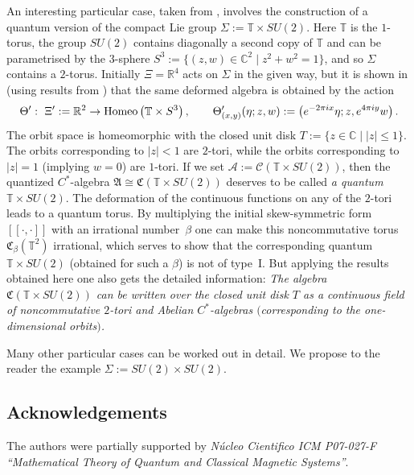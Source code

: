 \documentclass[pdftex]{sigma}
\def\A{{\mathcal A}}
\def\Th{\Theta}
\def\AA{\mathfrak A}
\def\C{\mathcal{C}}
\def\CC{{\mathfrak C}}
\def\Si{\Sigma}
\providecommand{\CC}{\mathfrak{C}}
\begin{document}
\begin{Example}\label{quartu}
An interesting particular case, taken from \cite{Rie3}, involves the construction of a quantum version of the compact Lie group
$\Si:=\mathbb T\times SU(2)$. Here $\mathbb T$ is the $1$-torus, the group $SU(2)$ contains diagonally a second
copy of $\mathbb T$ and can be parametrised
by the $3$-sphere $S^3:=\{(z,w)\in \mathbb C^2\mid z^2+w^2=1\}$, and so $\Si$ contains a $2$-torus.
Initially $\Xi=\mathbb R^4$ acts on $\Si$ in the
given way, but it is shown in \cite{Rie3} (using results from \cite{Rie1}) that the same deformed algebra is obtained
by the action
\[
\Th': \ \Xi':=\mathbb R^2\rightarrow{\rm Homeo}\left(\mathbb T\times S^3\right),\qquad
\Th'_{(x,y)}(\eta;z,w):=\left(e^{-2\pi ix}\eta;z,e^{4\pi iy}w\right).
\]
The orbit space is homeomorphic with the closed unit disk $T:=\{z\in\mathbb C\mid |z|\le 1\}$.
The orbits corresponding to $|z|<1$ are $2$-tori, while the orbits corresponding to $|z|=1$ (implying $w=0$) are $1$-tori.
If we set $\A:=\C(\mathbb T\times SU(2))$, then the quantized $C^*$-algebra $\AA\cong\CC(\mathbb T\times SU(2))$
deserves to be called {\it a quantum} $\mathbb T\times SU(2)$. The deformation of the continuous functions on
any of the $2$-tori leads to a quantum torus. By multiplying the initial skew-symmetric
form $[\![\cdot,\cdot]\!]$ with an irrational
number~$\beta$ one can make this noncommutative torus $\CC_\beta(\mathbb T^2)$ irrational,
which serves to show that the corresponding quantum
$\mathbb T\times SU(2)$ (obtained for such a $\beta$) is not of type~I. But applying the results obtained here one also gets the
detailed information: {\it The algebra $\CC(\mathbb T\times SU(2))$ can be written over the closed unit disk $T$ as
a continuous field of noncommutative $2$-tori and Abelian $C^*$-algebras $($corresponding to the one-dimensional orbits$)$.}

Many other particular cases can be worked out in detail. We propose to the reader the example $\Si:=SU(2)\times SU(2)$.
\end{Example}




\subsection*{Acknowledgements}

The authors were partially supported by \textit{N\'ucleo
Cientifico ICM P07-027-F ``Mathematical Theo\-ry of Quantum and
Classical Magnetic Systems''}.
\end{document}
